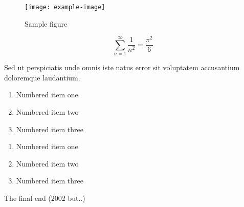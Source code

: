 \documentclass{article}
\begin{document}
\begin{figure}[h]
    \centering
    \texttt{[image: example-image]}
    \caption{Sample figure}
    \label{fig:sample}
\end{figure}


\begin{equation}
    \sum_{n=1}^{\infty} \frac{1}{n^2} = \frac{\pi^2}{6}
\end{equation}

Sed ut perspiciatis unde omnis iste natus error sit voluptatem accusantium doloremque laudantium.

\begin{enumerate}
\item Numbered item one
\item Numbered item two
\item Numbered item three
\end{enumerate}

\begin{enumerate}
\item Numbered item one
\item Numbered item two
\item Numbered item three
\end{enumerate}

The final end (2002 but..)

\end{document}
